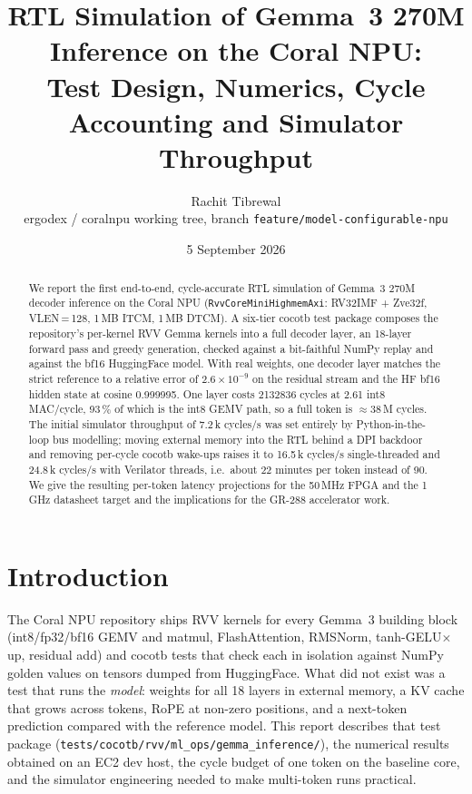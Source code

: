 \documentclass[10pt,twocolumn]{article}
\title{RTL Simulation of Gemma~3 270M Inference on the Coral NPU:\\
Test Design, Numerics, Cycle Accounting and Simulator Throughput}
\author{Rachit Tibrewal \\ \small ergodex / coralnpu working tree, branch \texttt{feature/model-configurable-npu}}
\date{5 September 2026}
\begin{document}
\maketitle

\begin{abstract}
We report the first end-to-end, cycle-accurate RTL simulation of Gemma~3 270M
decoder inference on the Coral NPU (\texttt{RvvCoreMiniHighmemAxi}: RV32IMF +
Zve32f, VLEN\,=\,128, 1\,MB ITCM, 1\,MB DTCM). A six-tier cocotb test package
composes the repository's per-kernel RVV Gemma kernels into a full decoder
layer, an 18-layer forward pass and greedy generation, checked against a
bit-faithful NumPy replay and against the bf16 HuggingFace model. With real
weights, one decoder layer matches the strict reference to a relative error of
$2.6\times10^{-9}$ on the residual stream and the HF bf16 hidden state at
cosine 0.999995. One layer costs \num{2132836} cycles at 2.61 int8 MAC/cycle,
93\,\% of which is the int8 GEMV path, so a full token is $\approx$38\,M
cycles. The initial simulator throughput of 7.2\,k cycles/s was set entirely by
Python-in-the-loop bus modelling; moving external memory into the RTL behind a
DPI backdoor and removing per-cycle cocotb wake-ups raises it to
16.5\,k cycles/s single-threaded and 24.8\,k cycles/s with
Verilator threads, i.e.\ about 22 minutes per token instead
of 90. We give the resulting per-token latency
projections for the 50\,MHz FPGA and the 1\,GHz datasheet target and the
implications for the GR-288 accelerator work.
\end{abstract}

\section{Introduction}
The Coral NPU repository ships RVV kernels for every Gemma~3 building block
(int8/fp32/bf16 GEMV and matmul, FlashAttention, RMSNorm, tanh-GELU$\times$up,
residual add) and cocotb tests that check each in isolation against NumPy
golden values on tensors dumped from HuggingFace. What did not exist was a
test that runs the \emph{model}: weights for all 18 layers in external memory,
a KV cache that grows across tokens, RoPE at non-zero positions, and a
next-token prediction compared with the reference model. This report describes
that test package (\texttt{tests/cocotb/rvv/ml\_ops/gemma\_inference/}), the
numerical results obtained on an EC2 dev host, the cycle budget of one token on
the baseline core, and the simulator engineering needed to make multi-token
runs practical.
\end{document}
